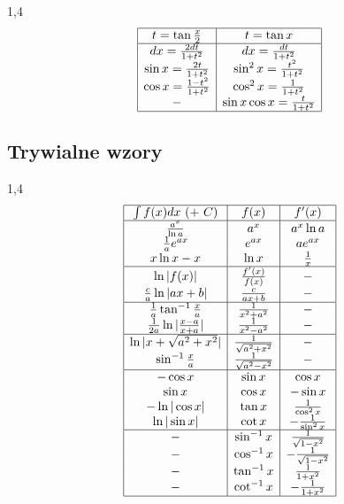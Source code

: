 \documentclass[11pt]{article}
\begin{document}
\begin{spacing}{1,4}
\[
\begin{array}{|c|c|c|}
	\hline
	t = \tan \frac{x}{2} & t = \tan x \\
	\hline
	dx = \frac{2dt}{1 + t^2} & dx = \frac{dt}{1 + t^2} \\
	\sin x = \frac{2t}{1 + t^2} & \sin^2 x = \frac{t^2}{1 + t^2} \\
	\cos x = \frac{1 - t^2}{1 + t^2} & \cos^2 x = \frac{1}{1 + t^2} \\
	- & \sin x \cos x = \frac{t}{1 + t^2} \\
	\hline
\end{array}
\]
\end{spacing}

\subsection{Trywialne wzory}

\begin{spacing}{1,4} \[ \begin{array}{|c|c|c|}
	\hline
		\int f(x) dx\ (+\ C) & f(x) & f'(x) \\
	\hline
		\frac{a^x}{\ln a} & a^x & a^x \ln a \\
		\frac{1}{a} e^{ax} & e^{ax} & ae^{ax} \\
		x \ln x - x & \ln x & \frac{1}{x} \\
	\hline
		\ln|f(x)| & \frac{f'(x)}{f(x)} & - \\
		\frac{c}{a} \ln|ax + b| & \frac{c}{ax +b} & - \\
	\hline
		\frac{1}{a} \tan^{-1} \frac{x}{a} & \frac{1}{x^2 + a^2} & - \\
		\frac{1}{2a} \ln|\frac{x - a}{x + a}| & \frac{1}{x^2 - a^2} & - \\
	\hline
		\ln|x + \sqrt{a^2 + x^2}| & \frac{1}{\sqrt{a^2 + x^2}} & - \\
		\sin^{-1} \frac{x}{a} & \frac{1}{\sqrt{a^2 - x^2}} & - \\
	\hline
		-\cos x		& \sin x	&  \cos x \\
		 \sin x		& \cos x	& -\sin x \\
		-\ln|\cos x|	& \tan x	&  \frac{1}{\cos^2 x} \\
		 \ln|\sin x|	& \cot x	& -\frac{1}{\sin^2 x} \\
	\hline
		 - & \sin^{-1} x	&  \frac{1}{\sqrt{1-x^2}} \\
		 - & \cos^{-1} x	& -\frac{1}{\sqrt{1-x^2}} \\
		 - & \tan^{-1} x	& \frac{1}{1+x^2} \\
		 - & \cot^{-1} x	& -\frac{1}{1+x^2} \\
	\hline
\end{array} \] \end{spacing}
\end{document}
